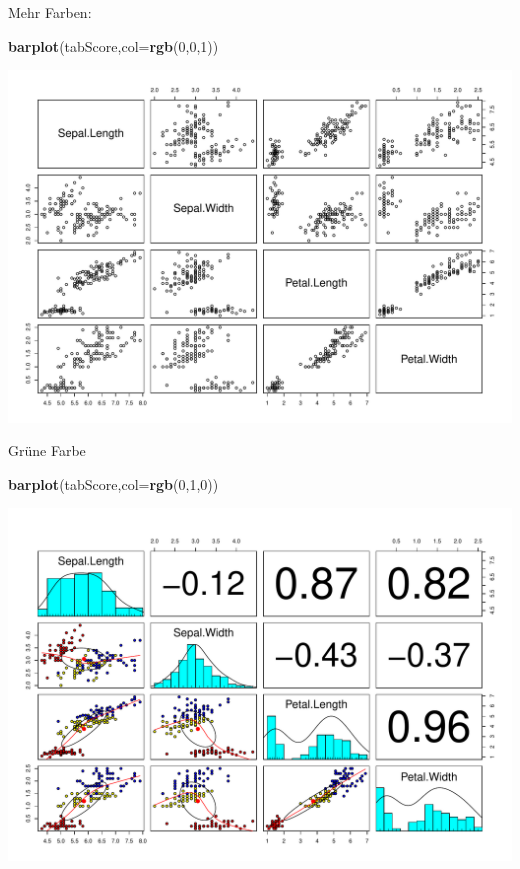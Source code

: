 \documentclass[ignorenonframetext,]{beamer}
\newenvironment{Shaded}{}{}
\newcommand{\KeywordTok}[1]{\textcolor[rgb]{0.00,0.44,0.13}{\textbf{{#1}}}}
\newcommand{\DataTypeTok}[1]{\textcolor[rgb]{0.56,0.13,0.00}{{#1}}}
\newcommand{\DecValTok}[1]{\textcolor[rgb]{0.25,0.63,0.44}{{#1}}}
\newcommand{\NormalTok}[1]{{#1}}
\begin{document}
\begin{frame}[fragile]{Mehr Farben:}

\begin{Shaded}
\begin{Highlighting}[]
\KeywordTok{barplot}\NormalTok{(tabScore,}\DataTypeTok{col=}\KeywordTok{rgb}\NormalTok{(}\DecValTok{0}\NormalTok{,}\DecValTok{0}\NormalTok{,}\DecValTok{1}\NormalTok{))}
\end{Highlighting}
\end{Shaded}

\includegraphics{R_intern_files/figure-beamer/unnamed-chunk-205-1.pdf}

\end{frame}

\begin{frame}[fragile]{Grüne Farbe}

\begin{Shaded}
\begin{Highlighting}[]
\KeywordTok{barplot}\NormalTok{(tabScore,}\DataTypeTok{col=}\KeywordTok{rgb}\NormalTok{(}\DecValTok{0}\NormalTok{,}\DecValTok{1}\NormalTok{,}\DecValTok{0}\NormalTok{))}
\end{Highlighting}
\end{Shaded}

\includegraphics{R_intern_files/figure-beamer/unnamed-chunk-206-1.pdf}

\end{frame}
\end{document}
